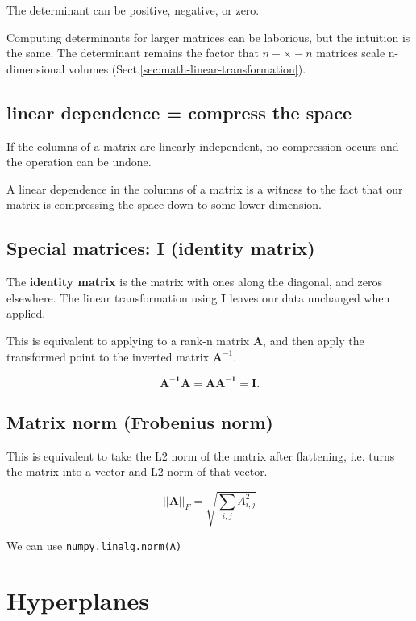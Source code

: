 The determinant can be positive, negative, or zero. 

Computing determinants for larger matrices can be laborious, but the intuition
is the same. The determinant remains the factor that $n-\times-n$ matrices scale
n-dimensional volumes (Sect.\ref{sec:math-linear-transformation}).


\subsection{linear dependence = compress the space}

If the columns of a matrix are linearly independent, no compression occurs and
the operation can be undone.

A linear dependence in the columns of a matrix is a witness to the fact that our
matrix is compressing the space down to some lower dimension.

\subsection{Special matrices: I (identity matrix)}

The {\bf identity matrix} is the matrix with ones along the diagonal, and zeros elsewhere. 
The linear transformation using $\mathbf{I}$ leaves our data unchanged when applied.

This is equivalent to applying to a rank-n matrix $\mathbf{A}$, and then apply
the transformed point to the inverted matrix $\mathbf{A}^{-1}$.

\begin{equation}
\mathbf{A^{-1}  A=AA^{-1} =I.}
\end{equation} 


\subsection{Matrix norm (Frobenius norm)}
\label{sec:math-norm-matrix}


This is equivalent to take the L2 norm of the matrix after flattening, i.e.
turns the matrix into a vector and L2-norm of that vector.

\begin{equation}
||\mathbf{A}||_F = \sqrt{\sum_{i,j}A^2_{i,j}}
\end{equation}


We can use \verb!numpy.linalg.norm(A)!




\section{Hyperplanes}
\label{sec:math-hyperplane}

